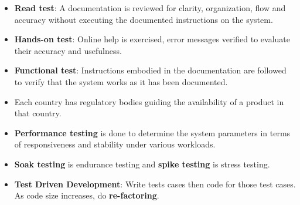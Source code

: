 \documentclass[a4paper]{article}
\begin{document}
\begin{itemize}
    \item \textbf{Read test}: A documentation is reviewed for clarity, organization, flow and accuracy without executing the documented instructions on the system.
    \item \textbf{Hands-on test}: Online help is exercised, error messages verified to evaluate their accuracy and usefulness.
    \item \textbf{Functional test}: Instructions embodied in the documentation are followed to verify that the system works as it has been documented.
    \item  Each country has regulatory bodies guiding the availability of a product in that country.
    \item \textbf{Performance testing} is done to determine the system parameters in terms of responsiveness and stability under various workloads.
    \item \textbf{Soak testing} is endurance testing and \textbf{spike testing} is stress testing.
    \item \textbf{Test Driven Development}: Write tests cases then code for those test cases. As code size increases, do \textbf{re-factoring}.
\end{itemize}
\end{document}
